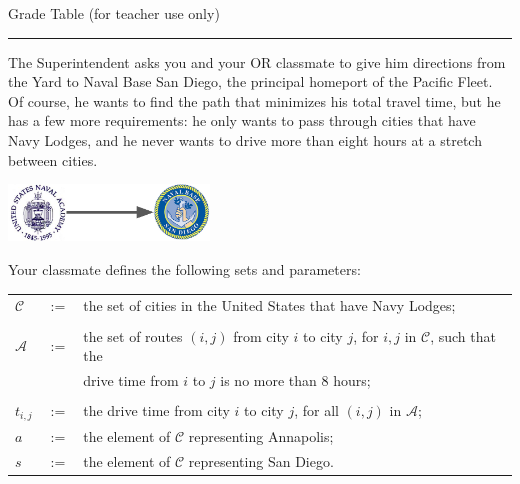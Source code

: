 \documentclass[12pt]{exam}
\begin{document}
\begin{center}
Grade Table (for teacher use only)\\
\addpoints
\gradetable[v][questions]
\end{center}

\noindent
\rule[2ex]{\textwidth}{2pt}

\newpage %


\begin{questions}

\question The Superintendent asks you and your OR classmate to give him directions from the Yard to Naval Base San Diego, the principal homeport of the Pacific Fleet. 
Of course, he wants to find the path that minimizes his total travel time, but he has a few more requirements: he only wants to pass through cities that have Navy Lodges, and he never wants to drive more than eight hours at a stretch between cities. 

\begin{center} 
\includegraphics[width = 0.4\textwidth]{usna_to_nbsd}
\end{center}

\smallskip

Your classmate defines the following sets and parameters:

\bigskip
\renewcommand{\arraystretch}{1}
\begin{tabular}{lcl}
$\mathcal{C}$ & $:=$ & the set of cities in the United States that have Navy Lodges; \\
\\
$\mathcal{A}$ & $:=$ & the set of routes $(i,j)$ from city $i$ to city $j$, for $i, j$ in $\mathcal{C}$, such that the \\
&& drive time from $i$ to $j$ is no more than 8 hours; \\
\\
$t_{i,j}$ & $:=$ & the drive time from city $i$ to city $j$, for all $(i,j)$ in $\mathcal{A}$;\\
$a$ & $:=$ & the element of $\mathcal{C}$ representing Annapolis;\\
$s$ & $:=$ & the element of $\mathcal{C}$ representing San Diego.\\
\end{tabular}


\end{questions}
\end{document}
